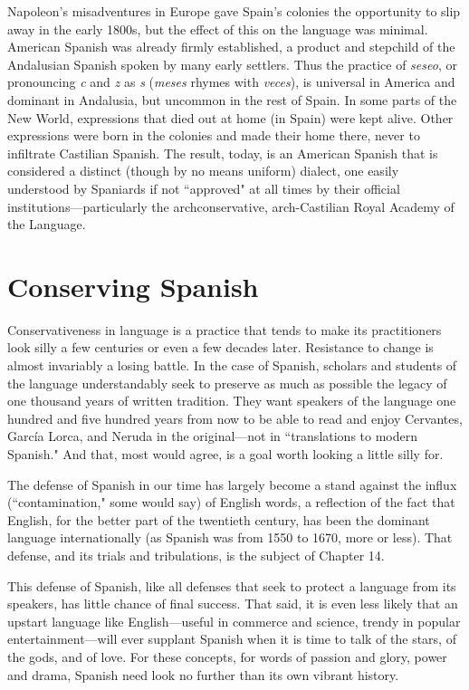 Napoleon's misadventures in Europe gave Spain's colonies the
opportunity to slip away in the early 1800s, but the effect of this on
the language was minimal. American Spanish was already firmly established, a product and stepchild of the Andalusian Spanish spoken by
many early settlers. Thus the practice of \emph{seseo}, or pronouncing \emph{c} and \emph{z}
as \emph{s} (\emph{meses} rhymes with \emph{veces}), is universal in America and dominant
in Andalusia, but uncommon in the rest of Spain. In some parts of the
New World, expressions that died out at home (in Spain) were kept
alive. Other expressions were born in the colonies and made their
home there, never to infiltrate Castilian Spanish. The result, today, is
an American Spanish that is considered a distinct (though by no means
uniform) dialect, one easily understood by Spaniards if not ``approved"
at all times by their official institutions---particularly the archconservative, arch-Castilian Royal Academy of the Language.

\section{Conserving Spanish}

Conservativeness in language is a practice that tends to make
its practitioners look silly a few centuries or even a few decades later.
Resistance to change is almost invariably a losing battle. In the case of
Spanish, scholars and students of the language understandably seek to
preserve as much as possible the legacy of one thousand years of written tradition. They want speakers of the language one hundred and five
hundred years from now to be able to read and enjoy Cervantes, García
Lorca, and Neruda in the original---not in ``translations to modern
Spanish." And that, most would agree, is a goal worth looking a little
silly for.

The defense of Spanish in our time has largely become a stand
against the influx (``contamination," some would say) of English words,
a reflection of the fact that English, for the better part of the twentieth
century, has been the dominant language internationally (as Spanish
was from 1550 to 1670, more or less). That defense, and its trials and
tribulations, is the subject of Chapter 14.

This defense of Spanish, like all defenses that seek to protect a
language from its speakers, has little chance of final success. That said,
it is even less likely that an upstart language like English---useful in
commerce and science, trendy in popular entertainment---will ever
supplant Spanish when it is time to talk of the stars, of the gods, and
of love. For these concepts, for words of passion and glory, power and
drama, Spanish need look no further than its own vibrant history.


